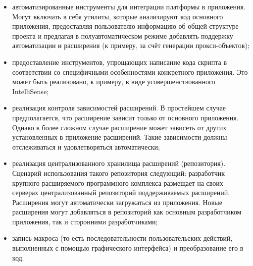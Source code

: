 \begin{itemize}
\item автоматизированные инструменты для интеграции платформы в приложения. Могут включать в себя утилиты, которые анализируют код основного приложения, предоставляя пользователю информацию об общей структуре проекта и предлагая в полуавтоматическом режиме добавлять поддержку автоматизации и расширения (к примеру, за счёт генерации прокси-объектов);
\item предоставление инструментов, упрощающих написание кода скрипта в соответствии со специфичными особенностями конкретного приложения. Это может быть реализовано, к примеру, в виде усовершенствованного IntelliSense;
\item реализация контроля зависимостей расширений. В простейшем случае предполагается, что расширение зависит только от основного приложения. Однако в более сложном случае расширение может зависеть от других установленных в приложение расширений. Такие зависимости должны отслеживаться и удовлетворяться автоматически;
\item реализация централизованного хранилища расширений (репозитория). Сценарий использования такого репозитория следующий: разработчик крупного расширяемого программного комплекса размещает на своих серверах централизованный репозиторий поддерживаемых расширений. Расширения могут автоматически загружаться из приложения. Новые расширения могут добавляться в репозиторий как основным разработчиком приложения, так и сторонними разработчиками;
\item запись макроса (то есть последовательности пользовательских действий, выполненных с помощью графического интерфейса) и преобразование его в код.
\end{itemize}

\pagebreak
